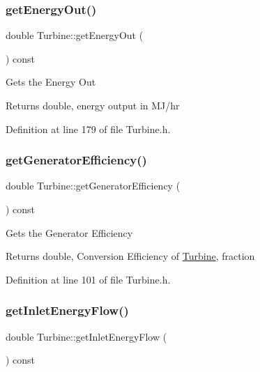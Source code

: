 \subsubsection{\texorpdfstring{get\+Energy\+Out()}{getEnergyOut()}}
{\footnotesize\ttfamily double Turbine\+::get\+Energy\+Out (\begin{DoxyParamCaption}{ }\end{DoxyParamCaption}) const\hspace{0.3cm}{\ttfamily [inline]}}

Gets the Energy Out

\begin{DoxyReturn}{Returns}
double, energy output in M\+J/hr 
\end{DoxyReturn}


Definition at line 179 of file Turbine.\+h.

\mbox{\label{class_turbine_a92266fd994310d1842ba37c05bc40bf8}} 
\subsubsection{\texorpdfstring{get\+Generator\+Efficiency()}{getGeneratorEfficiency()}}
{\footnotesize\ttfamily double Turbine\+::get\+Generator\+Efficiency (\begin{DoxyParamCaption}{ }\end{DoxyParamCaption}) const\hspace{0.3cm}{\ttfamily [inline]}}

Gets the Generator Efficiency

\begin{DoxyReturn}{Returns}
double, Conversion Efficiency of \hyperlink{class_turbine}{Turbine}, fraction 
\end{DoxyReturn}


Definition at line 101 of file Turbine.\+h.

\mbox{\label{class_turbine_ae5d55a7b882e4780d490d43409f8f06c}} 
\subsubsection{\texorpdfstring{get\+Inlet\+Energy\+Flow()}{getInletEnergyFlow()}}
{\footnotesize\ttfamily double Turbine\+::get\+Inlet\+Energy\+Flow (\begin{DoxyParamCaption}{ }\end{DoxyParamCaption}) const\hspace{0.3cm}{\ttfamily [inline]}}

